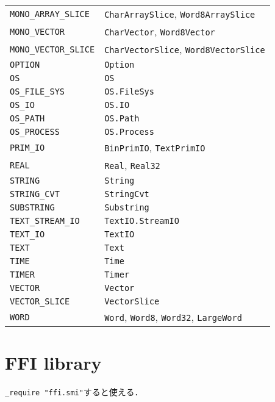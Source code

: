 \documentclass{jbook}
\begin{document}
{\begin{tabular}{ll}
{\tt MONO\_ARRAY\_SLICE}   & {\tt CharArraySlice}, {\tt Word8ArraySlice}\\
{\tt MONO\_VECTOR}         & {\tt CharVector}, {\tt Word8Vector}\\
{\tt MONO\_VECTOR\_SLICE}  & {\tt CharVectorSlice}, {\tt Word8VectorSlice}\\
{\tt OPTION}               & {\tt Option}\\
{\tt OS}                   & {\tt OS}\\
{\tt OS\_FILE\_SYS}        & {\tt OS.FileSys}\\
{\tt OS\_IO}               & {\tt OS.IO}\\
{\tt OS\_PATH}             & {\tt OS.Path}\\
{\tt OS\_PROCESS}          & {\tt OS.Process}\\
{\tt PRIM\_IO}             & {\tt BinPrimIO}, {\tt TextPrimIO}\\
{\tt REAL}                 & {\tt Real}, {\tt Real32}\\
{\tt STRING}               & {\tt String}\\
{\tt STRING\_CVT}          & {\tt StringCvt}\\
{\tt SUBSTRING}            & {\tt Substring}\\
{\tt TEXT\_STREAM\_IO}     & {\tt TextIO.StreamIO}\\
{\tt TEXT\_IO}             & {\tt TextIO}\\
{\tt TEXT}                 & {\tt Text}\\
{\tt TIME}                 & {\tt Time}\\
{\tt TIMER}                & {\tt Timer}\\
{\tt VECTOR}               & {\tt Vector}\\
{\tt VECTOR\_SLICE}        & {\tt VectorSlice}\\
{\tt WORD}                 & {\tt Word}, {\tt Word8}, {\tt Word32}, {\tt LargeWord}\\
\hline
\end{tabular}

\section{FFI library}

{\tt \_require "ffi.smi"}すると使える．


\Types


}
\end{document}

